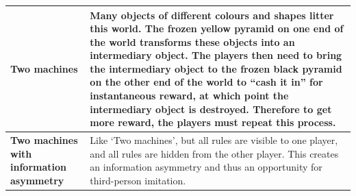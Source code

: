 \documentclass[11pt, a4paper, logo, copyright]{deepmind}
\begin{document}
\begin{appendix}
\begin{longtable}{|>{\raggedright}p{4cm}|p{12cm}|}
\textbf{Two machines} & Many objects of different colours and shapes litter this world. The frozen yellow pyramid on one end of the world transforms these objects into an intermediary object. The players then need to bring the intermediary object to the frozen black pyramid on the other end of the world to ``cash it in'' for instantaneous reward, at which point the intermediary object is destroyed. Therefore to get more reward, the players must repeat this process. \\ \hline
\textbf{Two machines with information asymmetry} & Like `Two machines', but all rules are visible to one player, and all rules are hidden from the other player. This creates an information asymmetry and thus an opportunity for third-person imitation. \\ \hline
\end{longtable}





\end{appendix}
\end{document}
